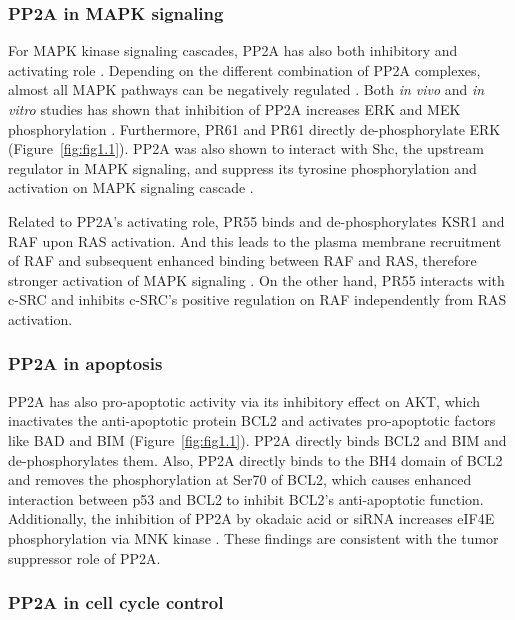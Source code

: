 \subsubsection{PP2A in MAPK signaling}

For MAPK kinase signaling cascades, PP2A has also both inhibitory and activating role \cite{eichhorn_protein_2009}. Depending on the different combination of PP2A complexes, almost all MAPK pathways can be negatively regulated \cite{junttila_phosphatase-mediated_2008}. Both \textit{in vivo} and \textit{in vitro} studies has shown that inhibition of PP2A increases ERK and MEK phosphorylation \cite{junttila_phosphatase-mediated_2008}. Furthermore, PR61\textbeta{} and PR61\textgamma{} directly de-phosphorylate ERK \cite{eichhorn_protein_2009} (Figure~\ref{fig:fig1.1}). PP2A was also shown to interact with Shc, the upstream regulator in MAPK signaling, and suppress its tyrosine phosphorylation and activation on MAPK signaling cascade \cite{junttila_phosphatase-mediated_2008}. 

Related to PP2A's activating role, PR55\textalpha{} binds and de-phosphorylates KSR1 and RAF upon RAS activation. And this leads to the plasma membrane recruitment of RAF and subsequent enhanced binding between RAF and RAS, therefore stronger activation of MAPK signaling \cite{eichhorn_protein_2009}. On the other hand, PR55\textgamma{} interacts with c-SRC and inhibits c-SRC's positive regulation on RAF independently from RAS activation. 


\subsubsection{PP2A in apoptosis}

PP2A has also pro-apoptotic activity via its inhibitory effect on AKT, which inactivates the anti-apoptotic protein BCL2 and activates pro-apoptotic factors like BAD and BIM \cite{eichhorn_protein_2009,janssens_role_2012} (Figure~\ref{fig:fig1.1}). PP2A directly binds BCL2 and BIM and de-phosphorylates them. Also, PP2A directly binds to the BH4 domain of BCL2 and removes the phosphorylation at Ser70 of BCL2, which causes enhanced interaction between p53 and BCL2 to inhibit BCL2's anti-apoptotic function. Additionally, the inhibition of PP2A by okadaic acid or siRNA increases eIF4E phosphorylation via MNK kinase \cite{li_protein_2010}. These findings are consistent with the tumor suppressor role of PP2A.


\subsubsection{PP2A in cell cycle control}

